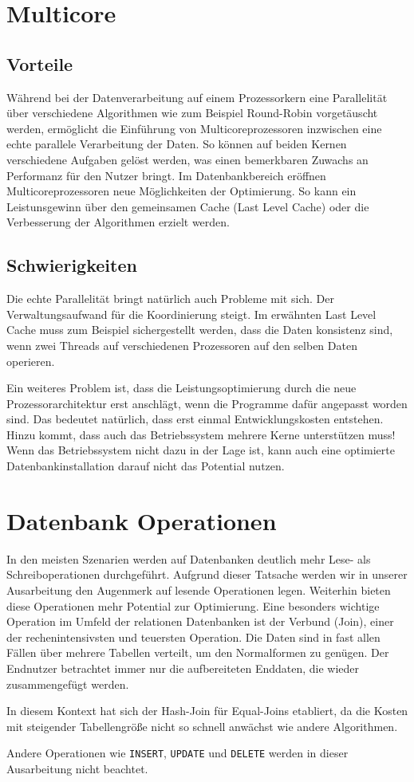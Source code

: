\section{Multicore}
\label{sec:Multicore}

\subsection*{Vorteile}
\label{sec:Multicore_Vorteile}

Während bei der Datenverarbeitung auf einem Prozessorkern eine Parallelität über verschiedene Algorithmen wie zum Beispiel Round-Robin vorgetäuscht werden, ermöglicht die Einführung von Multicoreprozessoren inzwischen eine echte parallele Verarbeitung der Daten. So können auf beiden Kernen verschiedene Aufgaben gelöst werden, was einen bemerkbaren Zuwachs an Performanz für den Nutzer bringt. Im Datenbankbereich eröffnen Multicoreprozessoren neue Möglichkeiten der Optimierung. So kann ein Leistunsgewinn über den gemeinsamen Cache (Last Level Cache) oder die Verbesserung der Algorithmen erzielt werden.

\subsection*{Schwierigkeiten}
\label{sec:Multicore_Schwierigkeiten}
Die echte Parallelität bringt natürlich auch Probleme mit sich. Der Verwaltungsaufwand für die Koordinierung steigt. Im erwähnten Last Level Cache muss zum Beispiel sichergestellt werden, dass 
die Daten konsistenz sind, wenn zwei Threads auf verschiedenen Prozessoren auf den selben Daten operieren. 

Ein weiteres Problem ist, dass die Leistungsoptimierung durch die neue Prozessorarchitektur erst anschlägt, wenn die Programme dafür angepasst worden sind. Das bedeutet natürlich, dass erst einmal Entwicklungskosten entstehen. Hinzu kommt, dass auch das Betriebssystem mehrere Kerne unterstützen muss! Wenn das Betriebssystem nicht dazu in der Lage ist, kann auch eine optimierte Datenbankinstallation darauf nicht das Potential nutzen.

\section{Datenbank Operationen}
\label{sec:Operationen}
In den meisten Szenarien werden auf Datenbanken deutlich mehr Lese- als Schreiboperationen durchgeführt. Aufgrund dieser Tatsache werden wir in unserer Ausarbeitung den Augenmerk auf lesende Operationen legen. Weiterhin bieten diese Operationen mehr Potential zur Optimierung. Eine besonders wichtige Operation im Umfeld der relationen Datenbanken ist der Verbund (Join), einer der rechenintensivsten und teuersten Operation. Die Daten sind in fast allen Fällen über mehrere Tabellen verteilt, um den Normalformen zu genügen. Der Endnutzer betrachtet immer nur die aufbereiteten Enddaten, die wieder zusammengefügt werden.

In diesem Kontext hat sich der Hash-Join für Equal-Joins etabliert, da die Kosten mit steigender Tabellengröße nicht so schnell anwächst wie andere Algorithmen. 

Andere Operationen wie \texttt{INSERT}, \texttt{UPDATE} und \texttt{DELETE} werden in dieser Ausarbeitung nicht beachtet.
